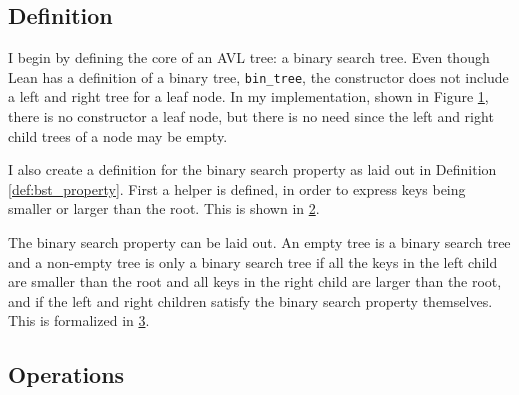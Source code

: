 \subsection*{Definition}

I begin by defining the core of an AVL tree: a binary search tree. Even though Lean has a definition of a binary tree, \lstinline{bin_tree}, the constructor does not include a left and right tree for a leaf node.
In my implementation, shown in Figure \ref{lst:btree}, there is no constructor a leaf node, but there is no need since the left and right child trees of a node may be empty.

\begin{figure}[!ht]
  \centering
  
  \caption{}
  \label{lst:btree}
\end{figure}

I also create a definition for the binary search property as laid out in Definition \ref{def:bst_property}. First a helper is defined, 
in order to express keys being smaller or larger than the root. This is shown in \ref{lst:forall_keys}.

\begin{figure}[!ht]
  \centering
  
  \caption{}
  \label{lst:forall_keys}
\end{figure}

The binary search property can be laid out. An empty tree is a binary search tree  and a non-empty tree is only a binary search tree if all the keys
in the left child are smaller than the root and all keys in the right child are larger than the root, and if the left and right children satisfy the binary search property themselves.
This is formalized in \ref{lst:ordered}.

\begin{figure}[!ht]
  \centering
  
  \caption{}
  \label{lst:ordered}
\end{figure}

\subsection*{Operations}